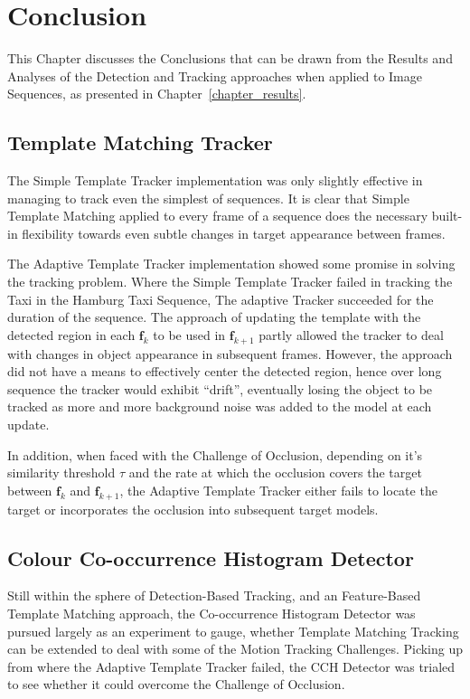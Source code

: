 \chapter{Conclusion}
This Chapter discusses the Conclusions that can be drawn from the Results
and Analyses of the Detection and Tracking approaches when applied to Image
Sequences, as presented in Chapter~\ref{chapter_results}.

\section{Template Matching Tracker}
The Simple Template Tracker implementation was only slightly effective in
managing to track even the simplest of sequences. It is clear that Simple Template
Matching applied to every frame of a sequence does the necessary built-in
flexibility towards even subtle changes in target appearance between frames.

The Adaptive Template Tracker implementation showed some promise in solving the
tracking problem. Where the Simple Template Tracker failed in tracking the
Taxi in the Hamburg Taxi Sequence, The adaptive Tracker succeeded for the
duration of the sequence. 
The approach of updating the template with the detected region in each
$\mathbf{f}_k$ to be used in $\mathbf{f}_{k+1}$ partly allowed the tracker to
deal with changes in object appearance in subsequent frames. However, the
approach did not have a means to effectively center the detected region, hence
over long sequence the tracker would exhibit ``drift'', eventually losing the
object to be tracked as more and more background noise was added to the model at
each update.

In addition, when faced with the Challenge of Occlusion, depending on it's
similarity threshold $\tau$ and the rate at which the occlusion covers the
target between $\mathbf{f}_k$ and $\mathbf{f}_{k+1}$, the Adaptive Template
Tracker either fails to locate the target or incorporates the occlusion into
subsequent target models.

\section{Colour Co-occurrence Histogram Detector}
Still within the sphere of Detection-Based Tracking, and an Feature-Based
Template Matching approach, the Co-occurrence Histogram Detector was pursued largely as an
experiment to gauge, whether Template Matching Tracking can be extended to deal
with some of the Motion Tracking Challenges. 
Picking up from where the Adaptive Template Tracker failed, the CCH Detector was
trialed to see whether it could overcome the Challenge of Occlusion.

